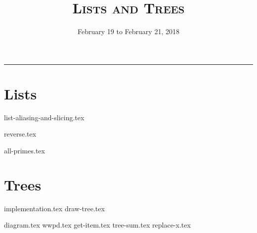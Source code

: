 \documentclass{exam}
\title{\textsc{Lists and Trees}}
\date{February 19 to February 21, 2018}
\begin{document}
\maketitle
\rule{\textwidth}{0.15em}
\fontsize{12}{15}\selectfont


\section{Lists}
\begin{questions}
{list-aliasing-and-slicing.tex}

\begin{blocksection}
{reverse.tex}
\end{blocksection}

\newpage
\begin{blocksection}
{all-primes.tex}
\end{blocksection}
\end{questions}

\newpage
\section{Trees}
{implementation.tex}
\vspace{2\baselineskip}
{draw-tree.tex}
\newpage
\begin{questions}
{diagram.tex}
{wwpd.tex}
\vspace{2\baselineskip}
{get-item.tex}
{tree-sum.tex}
\newpage
{replace-x.tex}

\end{questions}
\end{document}
